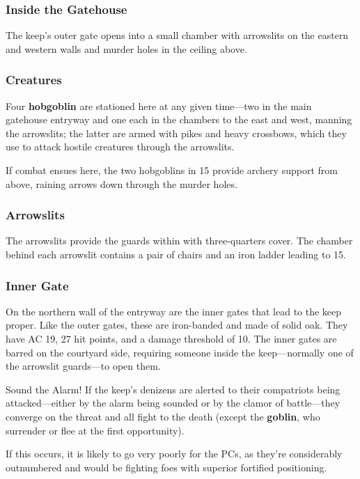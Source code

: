 \documentclass[10pt,a4paper,twoside,bg=print,twocolumn,openany,nodeprecatedcode]{dndbook}
\begin{document}
\subsubsection{Inside the Gatehouse}
The keep's outer gate opens into a small chamber with arrowslits on the eastern and western walls and murder holes in the ceiling above.

\subsubsection{Creatures}
Four \textbf{hobgoblin} are stationed here at any given time—two in the main gatehouse entryway and one each in the chambers to the east and west, manning the arrowslits; the latter are armed with pikes and heavy crossbows, which they use to attack hostile creatures through the arrowslits.

If combat ensues here, the two hobgoblins in 15 provide archery support from above, raining arrows down through the murder holes.

\subsubsection{Arrowslits}
The arrowslits provide the guards within with three-quarters cover. The chamber behind each arrowslit contains a pair of chairs and an iron ladder leading to 15.

\subsubsection{Inner Gate}
On the northern wall of the entryway are the inner gates that lead to the keep proper. Like the outer gates, these are iron-banded and made of solid oak. They have AC 19, 27 hit points, and a damage threshold of 10. The inner gates are barred on the courtyard side, requiring someone inside the keep—normally one of the arrowslit guards—to open them.

\begin{DndSidebar}[float=!b]{Sound the Alarm!}
If the keep's denizens are alerted to their compatriots being attacked—either by the alarm being sounded or by the clamor of battle—they converge on the threat and all fight to the death (except the \textbf{goblin}, who surrender or flee at the first opportunity).



If this occurs, it is likely to go very poorly for the PCs, as they're considerably outnumbered and would be fighting foes with superior fortified positioning.



\end{DndSidebar}
\end{document}
